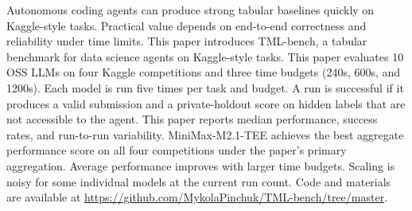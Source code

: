 Autonomous coding agents can produce strong tabular baselines quickly on Kaggle-style tasks. Practical value depends on end-to-end correctness and reliability under time limits. This paper introduces TML-bench, a tabular benchmark for data science agents on Kaggle-style tasks. This paper evaluates 10 OSS LLMs on four Kaggle competitions and three time budgets (240s, 600s, and 1200s). Each model is run five times per task and budget. A run is successful if it produces a valid submission and a private-holdout score on hidden labels that are not accessible to the agent. This paper reports median performance, success rates, and run-to-run variability. MiniMax-M2.1-TEE achieves the best aggregate performance score on all four competitions under the paper's primary aggregation. Average performance improves with larger time budgets. Scaling is noisy for some individual models at the current run count. Code and materials are available at \url{https://github.com/MykolaPinchuk/TML-bench/tree/master}.
